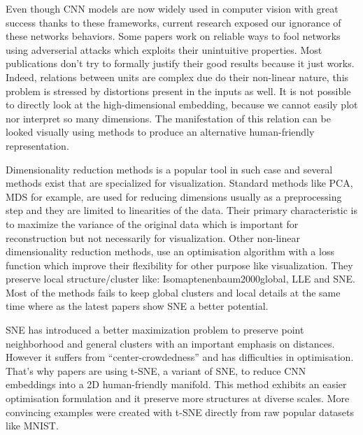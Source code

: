 \documentclass[a4paper,12pt]{report}
\begin{document}
Even though CNN models are now widely used in computer vision with great success thanks to these frameworks, current research exposed our ignorance of these networks behaviors.
Some papers work on reliable ways to fool networks using adverserial attacks which exploits their unintuitive properties\cite{szegedy2013intriguing}.
Most publications don't try to formally justify their good results because it just works. %
Indeed, relations between units are complex due do their non-linear nature, this problem is stressed by distortions present in the inputs as well.
It is not possible to directly look at the high-dimensional embedding, because we cannot easily plot nor interpret so many dimensions.
The manifestation of this relation can be looked visually using methods to produce an alternative human-friendly representation.

Dimensionality reduction methods is a popular tool in such case\cite{dai2014document}\cite{taylor2011learning} and several methods exist that are specialized for visualization.
Standard methods like PCA, MDS\cite{cox2000multidimensional} for example, are used for reducing dimensions usually as a preprocessing step and they are limited to linearities of the data.
Their primary characteristic is to maximize the variance of the original data which is important for reconstruction but not necessarily for visualization.
Other non-linear dimensionality reduction methods, use an optimisation algorithm with a loss function which improve their flexibility for other purpose like visualization.
They preserve local structure/cluster like: Isomap{tenenbaum2000global}, LLE\cite{roweis2000nonlinear} and SNE\cite{SNE}.
Most of the methods fails to keep global clusters and local details at the same time where as the latest papers show SNE a better potential\cite{SNE}.

SNE has introduced a better maximization problem to preserve point neighborhood and general clusters with an important emphasis on distances\cite{SNE}.
However it suffers from ``center-crowdedness'' and has difficulties in optimisation\cite{t-SNE}.
That's why papers are using t-SNE, a variant of SNE, to reduce CNN embeddings into a 2D human-friendly manifold. %
This method exhibits an easier optimisation formulation and it preserve more structures at diverse scales.
More convincing examples were created with t-SNE directly from raw popular datasets\cite{van2009new} like MNIST\cite{t-SNE}.
\end{document}
